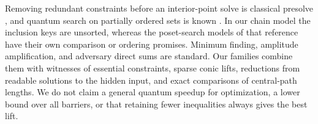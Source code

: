 Removing redundant constraints before an interior-point solve is
classical presolve \cite{Gondzio1997}, and quantum search on partially
ordered sets is known \cite{Montanaro2009}. In our chain model the
inclusion keys are unsorted, whereas the poset-search models of
that reference have their own comparison or ordering promises.
Minimum finding, amplitude amplification, and adversary direct sums are
standard. Our families combine them with witnesses of essential
constraints, sparse conic lifts, reductions
from readable solutions to the hidden input, and exact comparisons of
central-path lengths. We do not claim a general quantum speedup for
optimization, a lower bound over all barriers, or that retaining fewer
inequalities always gives the best lift.
